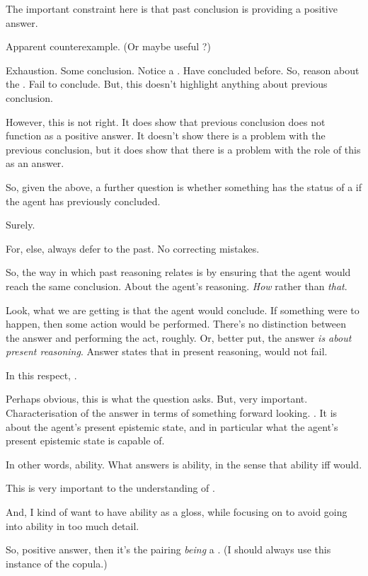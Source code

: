 \begin{note}
  The important constraint here is that past conclusion is providing a positive answer.

  Apparent counterexample. (Or maybe useful \illu{}?)

  Exhaustion.
  Some conclusion.
  Notice a \requ{}.
  Have concluded before.
  So, reason about the \requ{}.
  Fail to conclude.
  But, this doesn't highlight anything about previous conclusion.

  However, this is not right.
  It does show that previous conclusion does not function as a positive answer.
  It doesn't show there is a problem with the previous conclusion, but it does show that there is a problem with the role of this as an answer.
\end{note}

\begin{note}
  So, given the above, a further question is whether something has the status of a \requ{} if the agent has previously concluded.

  Surely.

  For, else, always defer to the past.
  No correcting mistakes.
\end{note}

\begin{note}
  So, the way in which past reasoning relates is by ensuring that the agent would reach the same conclusion.
  About the agent's reasoning.
  \emph{How} rather than \emph{that}.

  Look, what we are getting is that the agent would conclude.
  If something were to happen, then some action would be performed.
  There's no distinction between the answer and performing the act, roughly.
  Or, better put, the answer \emph{is about present reasoning}.
  Answer states that in present reasoning, would not fail.

  In this respect, \fc{}.

  Perhaps obvious, this is what the question asks.
  But, very important.
  Characterisation of the answer in terms of something forward looking.
  \fc{}.
  It is about the agent's present epistemic state, and in particular what the agent's present epistemic state is capable of.

  In other words, ability.
  What answers is ability, in the sense that ability iff would.

  This is very important to the understanding of \fc{}.

  And, I kind of want to have ability as a gloss, while focusing on \fc{} to avoid going into ability in too much detail.

  So, positive answer, then it's the pairing \emph{being} a \fc{}.
  (I should always use this instance of the copula.)
\end{note}

